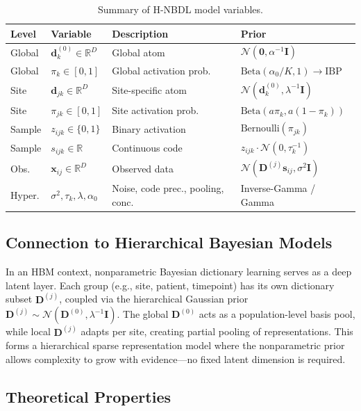 \documentclass[11pt,a4paper]{article}
\theoremstyle{definition}
\begin{document}
\begin{table}[t]
\centering
\caption{Summary of H-NBDL model variables.}
\label{tab:model}
\small
\begin{tabular}{@{}llll@{}}
\toprule
Level & Variable & Description & Prior \\
\midrule
Global & $\mathbf{d}^{(0)}_k \in \mathbb{R}^D$ & Global atom & $\mathcal{N}(\mathbf{0}, \alpha^{-1}\mathbf{I})$ \\
Global & $\pi_k \in [0,1]$ & Global activation prob. & $\text{Beta}(\alpha_0/K, 1) \to \text{IBP}$ \\
Site & $\mathbf{d}_{jk} \in \mathbb{R}^D$ & Site-specific atom & $\mathcal{N}(\mathbf{d}^{(0)}_k, \lambda^{-1}\mathbf{I})$ \\
Site & $\pi_{jk} \in [0,1]$ & Site activation prob. & $\text{Beta}(a\pi_k, a(1{-}\pi_k))$ \\
Sample & $z_{ijk} \in \{0,1\}$ & Binary activation & $\text{Bernoulli}(\pi_{jk})$ \\
Sample & $s_{ijk} \in \mathbb{R}$ & Continuous code & $z_{ijk} \cdot \mathcal{N}(0, \tau_k^{-1})$ \\
Obs. & $\mathbf{x}_{ij} \in \mathbb{R}^D$ & Observed data & $\mathcal{N}(\mathbf{D}^{(j)}\mathbf{s}_{ij}, \sigma^2\mathbf{I})$ \\
Hyper. & $\sigma^2, \tau_k, \lambda, \alpha_0$ & Noise, code prec., pooling, conc. & Inverse-Gamma / Gamma \\
\bottomrule
\end{tabular}
\end{table}

\subsection{Connection to Hierarchical Bayesian Models}

In an HBM context, nonparametric Bayesian dictionary learning serves as a deep latent layer. Each group (e.g., site, patient, timepoint) has its own dictionary subset $\mathbf{D}^{(j)}$, coupled via the hierarchical Gaussian prior $\mathbf{D}^{(j)} \sim \mathcal{N}(\mathbf{D}^{(0)}, \lambda^{-1}\mathbf{I})$. The global $\mathbf{D}^{(0)}$ acts as a population-level basis pool, while local $\mathbf{D}^{(j)}$ adapts per site, creating partial pooling of representations. This forms a hierarchical sparse representation model where the nonparametric prior allows complexity to grow with evidence---no fixed latent dimension is required.

\subsection{Theoretical Properties}\label{sec:theory}
\end{document}
